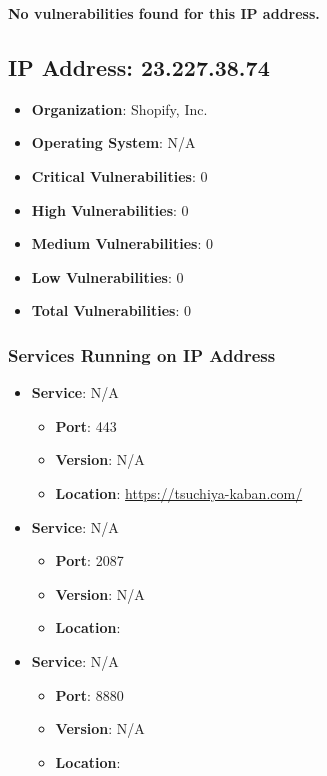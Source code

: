 \documentclass{article}
\begin{document}
\textbf{No vulnerabilities found for this IP address.}




\clearpage



\subsection{IP Address: 23.227.38.74}

\begin{itemize}
    \item \textbf{Organization}: Shopify, Inc.
    \item \textbf{Operating System}:  N/A 
    \item \textbf{Critical Vulnerabilities}: 0
    \item \textbf{High Vulnerabilities}: 0
    \item \textbf{Medium Vulnerabilities}: 0
    \item \textbf{Low Vulnerabilities}: 0
    \item \textbf{Total Vulnerabilities}: 0
\end{itemize}

\subsubsection*{Services Running on IP Address}

\begin{itemize}
    
        \item \textbf{Service}: N/A
        \begin{itemize}
            \item \textbf{Port}: 443
            \item \textbf{Version}:  N/A 
            \item \textbf{Location}: \href{ https://tsuchiya-kaban.com/ }{ https://tsuchiya-kaban.com/ }
        \end{itemize}
    
        \item \textbf{Service}: N/A
        \begin{itemize}
            \item \textbf{Port}: 2087
            \item \textbf{Version}:  N/A 
            \item \textbf{Location}: \href{  }{  }
        \end{itemize}
    
        \item \textbf{Service}: N/A
        \begin{itemize}
            \item \textbf{Port}: 8880
            \item \textbf{Version}:  N/A 
            \item \textbf{Location}: \href{  }{  }
        \end{itemize}
    
\end{itemize}
\end{document}
